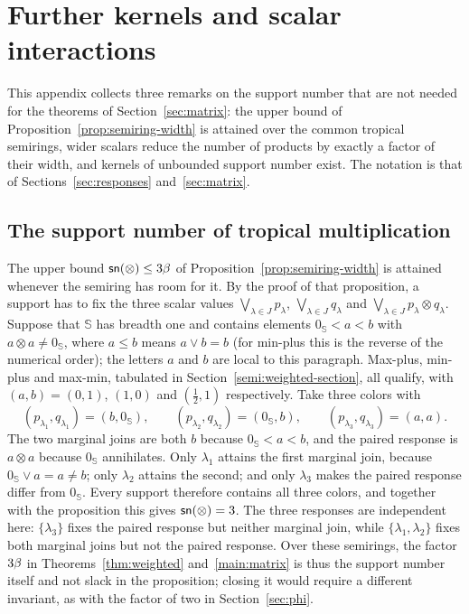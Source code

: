 \section{Further kernels and scalar interactions}\label{app:kernels}
This appendix collects three remarks on the support number that are not
needed for the theorems of Section~\ref{sec:matrix}: the upper bound of
Proposition~\ref{prop:semiring-width} is attained over the common tropical
semirings, wider scalars reduce the number of products by exactly a factor
of their width, and kernels of unbounded support number exist. The notation is that
of Sections~\ref{sec:responses} and~\ref{sec:matrix}.

\subsection{The support number of tropical multiplication}\label{app:tropical}
The upper bound $\mathsf{sn}(\otimes)\le3\beta$ of
Proposition~\ref{prop:semiring-width} is attained whenever the semiring has
room for it. By the proof of that proposition, a support has to fix the
three scalar values $\bigvee_{\lambda\in J}p_\lambda$,
$\bigvee_{\lambda\in J}q_\lambda$ and
$\bigvee_{\lambda\in J}p_\lambda\otimes q_\lambda$. Suppose that
$\mathbb S$ has breadth one and contains elements $0_{\mathbb S}<a<b$ with
$a\otimes a\ne0_{\mathbb S}$, where $a\le b$ means $a\vee b=b$ (for
min-plus this is the reverse of the numerical order); the letters $a$ and
$b$ are local to this paragraph. Max-plus, min-plus and max-min, tabulated in
Section~\ref{semi:weighted-section}, all qualify, with $(a,b)=(0,1)$,
$(1,0)$ and $(\tfrac12,1)$ respectively. Take three colors with
\[
 (p_{\lambda_1},q_{\lambda_1})=(b,0_{\mathbb S}),\qquad
 (p_{\lambda_2},q_{\lambda_2})=(0_{\mathbb S},b),\qquad
 (p_{\lambda_3},q_{\lambda_3})=(a,a).
\]
The two marginal joins are both $b$ because $0_{\mathbb S}<a<b$, and the
paired response is $a\otimes a$ because $0_{\mathbb S}$ annihilates. Only
$\lambda_1$ attains the first marginal join, because
$0_{\mathbb S}\vee a=a\ne b$; only $\lambda_2$ attains the second; and only
$\lambda_3$ makes the paired response differ from $0_{\mathbb S}$. Every
support therefore contains all three colors, and together with the
proposition this gives $\mathsf{sn}(\otimes)=3$. The three responses are independent
here: $\{\lambda_3\}$ fixes the paired response but neither marginal join,
while $\{\lambda_1,\lambda_2\}$ fixes both marginal joins but not the paired
response. Over these semirings, the factor $3\beta$ in
Theorems~\ref{thm:weighted} and~\ref{main:matrix} is thus the support
number itself and not slack in the proposition; closing it would require a
different invariant, as with the factor of two in Section~\ref{sec:phi}.

